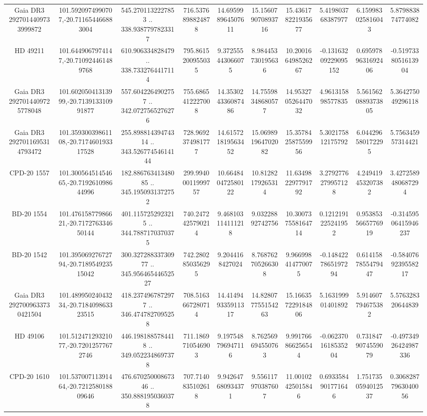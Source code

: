 \begin{table}
\begin{tabular}{cccccccccc}
Gaia DR3 2927014409733999872 & 101.5920974990707,-20.711654466883004 & 545.2701132227853 .. 338.9387797823317 & 716.5376898824878 & 14.695998964507611 & 15.156079070893716 & 15.436178221935677 & 5.419803768387977 & 6.159983025816043 & 5.879883874774082 \\
HD  49211 & 101.6449067974147,-20.710924461489768 & 610.906334828479 .. 338.7332764417114 & 795.8615200955035 & 9.372555443066075 & 8.984453730195636 & 10.200166498526267 & -0.13163209229095152 & 0.6959789631692406 & -0.5197338051613904 \\
Gaia DR3 2927014409725778048 & 101.60205041313999,-20.713913310991877 & 557.6042264902757 .. 342.0727565276276 & 755.6865412227008 & 14.353024336087486 & 14.75598348680577 & 14.953270526447032 & 4.961315898577835 & 5.5615620889373805 & 5.364275049296118 \\
Gaia DR3 2927011695314793472 & 101.35930039861108,-20.717460193317528 & 255.89881439474314 .. 343.52677454614144 & 728.9692374981777 & 14.615721819563452 & 15.069891964702082 & 15.357842587559956 & 5.302175812175792 & 6.044296580172295 & 5.756345957314421 \\
CPD-20  1557 & 101.30056451454665,-20.719261098644996 & 182.88676341348085 .. 345.1950931372752 & 299.99400011999757 & 10.664840472580122 & 10.81282179265314 & 11.634982297791792 & 3.2792776279957128 & 4.249419453207382 & 3.4272589480687294 \\
BD-20  1554 & 101.47615877986621,-20.717276334650144 & 401.1157252923215 .. 344.7887170370375 & 740.2472425790214 & 9.468103114111218 & 9.03228892742756 & 10.300737558164714 & 0.1212191225241952 & 0.9538535665776919 & -0.31459506415946237 \\
BD-20  1542 & 101.39506927672794,-20.718954923515042 & 300.32728833730977 .. 345.95646544652527 & 742.2802850356295 & 9.2044168427024 & 8.768762705266308 & 9.966998414770075 & -0.1484227865197294 & 0.6141587855479447 & -0.5840769239558217 \\
Gaia DR3 2927009633730421504 & 101.48995024043234,-20.718409863323515 & 418.2374967872977 .. 346.4747827095258 & 708.5163667280714 & 14.414949335911317 & 14.828077755154263 & 15.166357229184806 & 5.163199901401892 & 5.914607794675382 & 5.576328320644839 \\
HD  49106 & 101.51247129321077,-20.72012577672746 & 446.1981885784418 .. 349.0522348697378 & 711.1869710546903 & 9.197548796947116 & 8.762569694550763 & 9.991766866256544 & -0.0623701618535204 & 0.7318479074559079 & -0.49734926424987336 \\
CPD-20  1610 & 101.53700711391464,-20.721258018809646 & 476.67025000867346 .. 350.8881950360378 & 707.7140835102618 & 9.942647680934371 & 9.556117970387607 & 11.00102425015846 & 0.6933584901771646 & 1.7517350594012537 & 0.30682877963040056 \\

\end{tabular}
\end{table}
